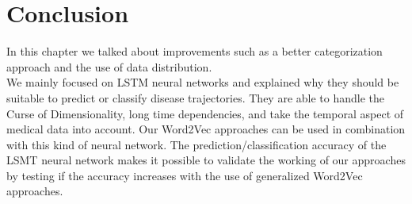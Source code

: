 \section{Conclusion}

In this chapter we talked about improvements such as a better categorization approach and the use of data distribution. \\
We mainly focused on LSTM neural networks and explained why they should be suitable to predict or classify disease trajectories. They are able to handle the Curse of Dimensionality, long time dependencies, and take the temporal aspect of medical data into account. Our Word2Vec approaches can be used in combination with this kind of neural network. The prediction/classification accuracy of the LSMT neural network makes it possible to validate the working of our approaches by testing if the accuracy increases with the use of generalized Word2Vec approaches. 


